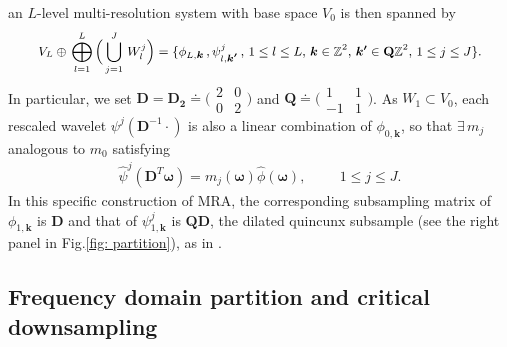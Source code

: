  an $L$-level multi-resolution system with base space $V_0$ is then spanned by
 \begin{align}\label{eq: MRA}
 V_L\oplus\,\bigoplus_{l=1}^L\Big(\bigcup_{j=1}^J\, W_l^j\Big) =
 \{\phi_{L,\boldsymbol{k}}\,,\psi^j_{l,\boldsymbol{k'}}\,, \, {\small 1\leq l \leq L,\, \boldsymbol{k}\in \mathbb{Z}^2,\,\boldsymbol{k'}\in \mathbf{Q}\mathbb{Z}^2,\,1\leq j \leq J\}}.
\end{align}  
In particular, we set $\mathbf{D} = \mathbf{D_2}\doteq\bigl(\begin{smallmatrix} 2&0\\0&2\end{smallmatrix}\bigr)$ and $\mathbf{Q}\doteq\bigl(\begin{smallmatrix} 1&1\\-1&1\end{smallmatrix}\bigr)$.
As $W_1\subset V_0$, each rescaled wavelet $\psi^j(\mathbf{D}^{-1}\cdot)$ is also a linear combination of $\phi_{0,\boldsymbol{k}}$, so that $\exists\, m_j$ analogous to $m_0$
satisfying 
\begin{align}\label{eq: mj}
\widehat{\psi}^j(\mathbf{D}^T\boldsymbol{\omega}) = m_j(\boldsymbol{\omega})\widehat{\phi}(\boldsymbol{\omega}),\hspace{1cm} 1\leq j \leq J.
\end{align}
In this specific construction of MRA,
 the corresponding subsampling matrix of $\phi_{1,\boldsymbol{k}}$ is $\mathbf{D}$ and that of $\psi^j_{1,\boldsymbol{k}}$ is $\mathbf{QD}$, the dilated quincunx subsample (see the right panel in Fig.\ref{fig: partition}), as in \cite{durand2007}. 


\subsection{Frequency domain partition and critical downsampling}


